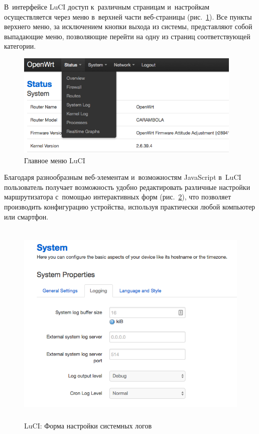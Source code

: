 В~интерфейсе LuCI доступ к~различным страницам и~настройкам осуществляется через меню в~верхней части веб-страницы (рис.~\ref{fig:openwrt-menu}). Все пункты верхнего меню, за исключением кнопки выхода из системы, представляют собой выпадающие меню, позволяющие перейти на одну из страниц соответствующей категории.

\begin{figure}[h!]
  \centering
  \includegraphics[height=5cm]{img/openwrt-menu}
  \vspace*{12pt}
  \caption{Главное меню LuCI}\label{fig:openwrt-menu}
\end{figure}

Благодаря разнообразным веб-элементам и~возможностям JavaScript в~LuCI пользователь получает возможность удобно редактировать различные настройки маршрутизатора с~помощью интерактивных форм (рис.~\ref{fig:openwrt-logging-settings}), что позволяет производить конфигурацию устройства, используя практически любой компьютер или смартфон.

\begin{figure}[h!]
  \centering
  \includegraphics[height=10cm]{img/openwrt-logging-settings}
  \vspace*{12pt}
  \caption{LuCI: Форма настройки системных логов}\label{fig:openwrt-logging-settings}
\end{figure}

